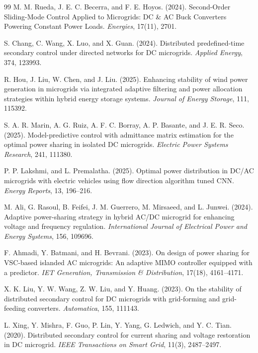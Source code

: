 \documentclass[]{interact}
\theoremstyle{plain}%
\theoremstyle{definition}
\theoremstyle{remark}
\begin{document}
\begin{thebibliography}{99}
M. M. Rueda, J. E. C. Becerra, and F. E. Hoyos. (2024). Second-Order Sliding-Mode Control Applied to Microgrids: DC \& AC Buck Converters Powering Constant Power Loads. \emph{Energies}, 17(11), 2701.

 S. Chang, C. Wang, X. Luo, and X. Guan. (2024). Distributed predefined-time secondary control under directed networks for DC microgrids. \emph{Applied Energy}, 374, 123993.

R. Hou, J. Liu, W. Chen, and J. Liu. (2025). Enhancing stability of wind power generation in microgrids via integrated adaptive filtering and power allocation strategies within hybrid energy storage systems. \emph{Journal of Energy Storage}, 111, 115392.

S. A. R. Marin, A. G. Ruiz, A. F. C. Borray, A. P. Basante, and J. E. R. Seco. (2025). Model-predictive control with admittance matrix estimation for the optimal power sharing in isolated DC microgrids. \emph{Electric Power Systems Research}, 241, 111380.

P. P. Lakshmi, and L. Premalatha. (2025). Optimal power distribution in DC/AC microgrids with electric vehicles using flow direction algorithm tuned CNN. \emph{Energy Reports}, 13, 196–216.

M. Ali, G. Rasoul, B. Feifei, J. M. Guerrero, M. Mirsaeed, and L. Junwei. (2024). Adaptive power-sharing strategy in hybrid AC/DC microgrid for enhancing voltage and frequency regulation. \emph{International Journal of Electrical Power and Energy Systems}, 156, 109696.

F. Ahmadi, Y. Batmani, and H. Bevrani. (2023). On design of power sharing for VSC-based islanded AC microgrids: An adaptive MIMO controller equipped with a predictor. \emph{IET Generation, Transmission \& Distribution}, 17(18), 4161–4171.

X. K. Liu, Y. W. Wang, Z. W. Liu, and Y. Huang. (2023). On the stability of distributed secondary control for DC microgrids with grid-forming and grid-feeding converters. \emph{Automatica}, 155, 111143.

L. Xing, Y. Mishra, F. Guo, P. Lin, Y. Yang, G. Ledwich, and Y. C. Tian. (2020). Distributed secondary control for current sharing and voltage restoration in DC microgrid. \emph{IEEE Transactions on Smart Grid}, 11(3), 2487–2497.


\end{thebibliography}
\end{document}
